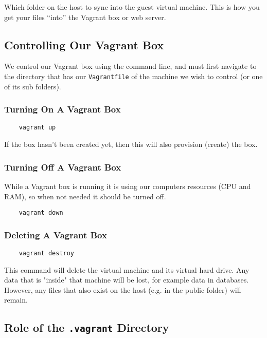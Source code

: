 Which folder on the host to sync into the guest virtual machine. This is how you get your files ``into'' the Vagrant box or web server.

\subsection{Controlling Our Vagrant Box}

We control our Vagrant box using the command line, and must first navigate to the directory that has our \texttt{Vagrantfile} of the machine we wish to control (or one of its sub folders).

\subsubsection{Turning On A Vagrant Box}

\begin{verbatim}
    vagrant up
\end{verbatim}

If the box hasn't been created yet, then this will also provision (create) the box.

\subsubsection{Turning Off A Vagrant Box}

While a Vagrant box is running it is using our computers resources (CPU and RAM), so when not needed it should be turned off.

\begin{verbatim}
    vagrant down
\end{verbatim}

\subsubsection{Deleting A Vagrant Box}

\begin{verbatim}
    vagrant destroy
\end{verbatim}

This command will delete the virtual machine and its virtual hard drive. Any data that is "inside" that machine will be lost, for example data in databases.
\\

However, any files that also exist on the host (e.g. in the public folder) will remain.

\subsection{Role of the \texttt{.vagrant} Directory}


